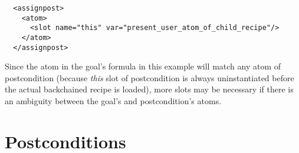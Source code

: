 \lstset{language=XML}
\begin{lstlisting}
  <assignpost>
    <atom>
      <slot name="this" var="present_user_atom_of_child_recipe"/>
    </atom>
  </assignpost>
\end{lstlisting}

Since the atom in the goal's formula in this example will match any atom of postcondition (because \textsl{this} slot of postcondition is always uninstantiated before the actual backchained recipe is loaded), more slots may be necessary if there is an ambiguity between the goal's and postcondition's atoms.

\section{Postconditions}

